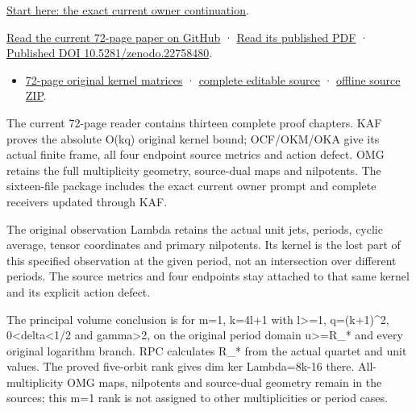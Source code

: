 \documentclass[
]{article}
\providecommand{\tightlist}{%
  \setlength{\itemsep}{0pt}\setlength{\parskip}{0pt}}
\begin{document}
\href{https://github.com/KokunoYumeto/zeta-function-research-reader/blob/5817ef9027257375b6ff3de7048b3331077251e7/workbenches/splitzero-tandem/continuations/20260914-original-kernel-matrices/00_CONTINUE_HERE.md}{Start
here: the exact current owner continuation}.

\href{https://github.com/KokunoYumeto/zeta-function-research-reader/blob/5817ef9027257375b6ff3de7048b3331077251e7/workbenches/splitzero-tandem/continuations/20260914-original-kernel-matrices/15_CURRENT_MIXED_CONTROL_READER.pdf}{Read
the current 72-page paper on GitHub} ·
\href{https://zenodo.org/api/records/22758480/files/53-original-kernel-matrices-reader.pdf/content}{Read
its published PDF} ·
\href{https://doi.org/10.5281/zenodo.22758480}{Published DOI
10.5281/zenodo.22758480}.

\begin{itemize}
\tightlist
\item
  \href{https://zenodo.org/api/records/22758480/files/53-original-kernel-matrices-reader.pdf/content}{72-page
  original kernel matrices} ·
  \href{https://github.com/KokunoYumeto/zeta-function-research-reader/tree/5817ef9027257375b6ff3de7048b3331077251e7/workbenches/splitzero-tandem/continuations/20260914-original-kernel-matrices}{complete
  editable source} ·
  \href{https://zenodo.org/api/records/22758480/files/54-original-kernel-matrices-sources.zip/content}{offline
  source ZIP}.
\end{itemize}

The current 72-page reader contains thirteen complete proof chapters.
KAF proves the absolute O(kq) original kernel bound; OCF/OKM/OKA give
its actual finite frame, all four endpoint source metrics and action
defect. OMG retains the full multiplicity geometry, source-dual maps and
nilpotents. The sixteen-file package includes the exact current owner
prompt and complete receivers updated through KAF.

The original observation Lambda retains the actual unit jets, periods,
cyclic average, tensor coordinates and primary nilpotents. Its kernel is
the lost part of this specified observation at the given period, not an
intersection over different periods. The source metrics and four
endpoints stay attached to that same kernel and its explicit action
defect.

The principal volume conclusion is for m=1, k=4l+1 with l\textgreater=1,
q=(k+1)\^{}2, 0\textless delta\textless1/2 and gamma\textgreater2, on
the original period domain \textbar u\textbar\textgreater=R\_* and every
original logarithm branch. RPC calculates R\_* from the actual quartet
and unit values. The proved five-orbit rank gives dim ker Lambda=8k-16
there. All-multiplicity OMG maps, nilpotents and source-dual geometry
remain in the sources; this m=1 rank is not assigned to other
multiplicities or period cases.
\end{document}
